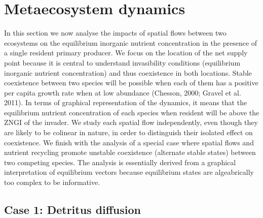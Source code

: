 \documentclass[letterpaper,twocolumn,showkeys]{revtex4-1}
\begin{document}
\section{Metaecosystem dynamics}

In this section we now analyse the impacts of spatial flows between two ecosystems on the equilibrium inorganic nutrient concentration in the presence of a single resident primary producer. We focus on the location of the net supply point because it is central to understand invasibility conditions (equilibrium inorganic nutrient concentration) and thus coexistence in both locations. Stable coexistence between two species will be possible when each of them has a positive per capita growth rate when at low abundance (Chesson, 2000; Gravel et al. 2011). In terms of graphical representation of the dynamics, it means that the equilibrium nutrient concentration of each species when resident will be above the ZNGI of the invader. We study each spatial flow independently, even though they are likely to be colinear in nature, in order to distinguish their isolated effect on coexistence. We finish with the analysis of a special case where spatial flows and nutrient recycling promote unstable coexistence (alternate stable states) between two competing species. The analysis is essentially derived from a graphical interpretation of equilibrium vectors because equilibrium states are algeabrically too complex to be informative.

\subsection{Case 1: Detritus diffusion}
\end{document}
